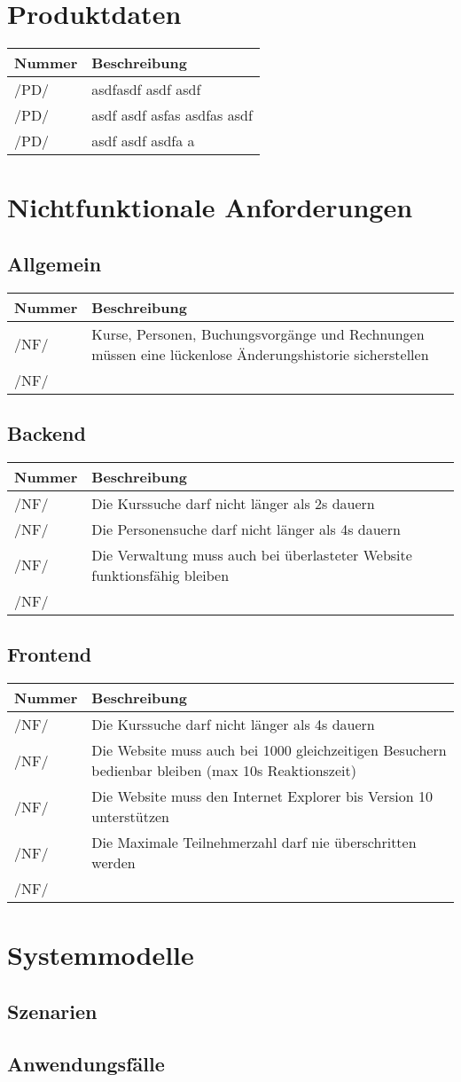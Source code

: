 \documentclass[a4paper,12pt]{article}
\newcommand\addrow[2]{#1 &#2\\ }
\newcommand\addheading[2]{#1 &#2\\ \hline}
\newcommand\tabularhead{\begin{tabular}{lp{13cm}}
\hline
}
\newenvironment{usecase}{\tabularhead}
{\hline\end{tabular}}
\begin{document}
\section{Produktdaten}
\begin{usecase}
  \addheading{Nummer}{Beschreibung} 
  \addrow{/PD/}{asdfasdf asdf asdf }
  \addrow{/PD/}{asdf asdf asfas asdfas asdf}
  \addrow{/PD/}{asdf asdf asdfa a}
\end{usecase}

\section{Nichtfunktionale Anforderungen}
\subsection{Allgemein}
\begin{usecase}
  \addheading{Nummer}{Beschreibung} 
  \addrow{/NF/}{Kurse, Personen, Buchungsvorgänge und Rechnungen müssen eine lückenlose Änderungshistorie sicherstellen}
  \addrow{/NF/}{}
\end{usecase}

\subsection{Backend}
\begin{usecase}
  \addheading{Nummer}{Beschreibung} 
  \addrow{/NF/}{Die Kurssuche darf nicht länger als 2s dauern}
  \addrow{/NF/}{Die Personensuche darf nicht länger als 4s dauern}
  \addrow{/NF/}{Die Verwaltung muss auch bei überlasteter Website funktionsfähig bleiben}
  \addrow{/NF/}{}
\end{usecase}

\subsection{Frontend}
\begin{usecase}
  \addheading{Nummer}{Beschreibung} 
  \addrow{/NF/}{Die Kurssuche darf nicht länger als 4s dauern}
  \addrow{/NF/}{Die Website muss auch bei 1000 gleichzeitigen Besuchern bedienbar bleiben (max 10s Reaktionszeit)}
  \addrow{/NF/}{Die Website muss den Internet Explorer bis Version 10 unterstützen}
  \addrow{/NF/}{Die Maximale Teilnehmerzahl darf nie überschritten werden}
  \addrow{/NF/}{}
\end{usecase}

\section{Systemmodelle}
\subsection{Szenarien}
\subsection{Anwendungsfälle}

\clearpage
 
\end{document}
